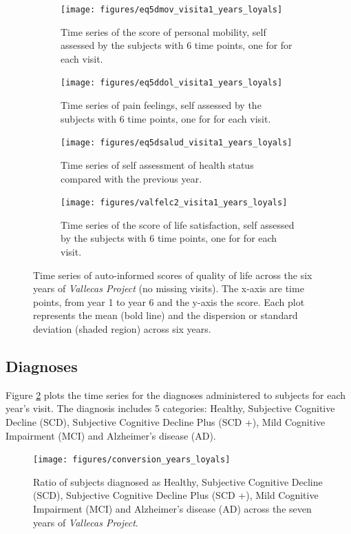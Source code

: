 \documentclass[11pt]{article}
\theoremstyle{definition}
\theoremstyle{remark}
\begin{document}
\begin{figure}[H]
    \centering
    \begin{subfigure}[t]{0.45\textwidth}
        \centering
        \texttt{[image: figures/eq5dmov\_visita1\_years\_loyals]}
        \caption{Time series of the score of personal mobility, self assessed by the subjects with 6 time points, one for for each visit.}
    \end{subfigure}
    \hfill 
    \begin{subfigure}[t]{0.45\textwidth}
        \centering
        \texttt{[image: figures/eq5ddol\_visita1\_years\_loyals]}
        \caption{Time series of pain feelings, self assessed by the subjects with 6 time points, one for for each visit.}
    \end{subfigure}%
    
     \begin{subfigure}[t]{0.45\textwidth}
        \centering
        \texttt{[image: figures/eq5dsalud\_visita1\_years\_loyals]}
        \caption{Time series of self assessment of health status compared with the previous year.}
    \end{subfigure}
    \hfill
    \begin{subfigure}[t]{0.45\textwidth}
        \centering
        \texttt{[image: figures/valfelc2\_visita1\_years\_loyals]}
        \caption{Time series of the score of life satisfaction, self assessed by the subjects with 6 time points, one for for each visit.}
    \end{subfigure}%
    \caption{Time series of auto-informed scores of quality of life across the six years of \emph{Vallecas Project} (no missing visits). The x-axis are time points, from year 1 to year 6 and the y-axis the score. Each plot represents the mean (bold line) and the dispersion or standard deviation (shaded region) across six years.}
    \label{fig:qol4}
\end{figure}

\subsection{Diagnoses}
\label{sse:diagn}

Figure \ref{fig:diag1} plots the time series for the diagnoses administered to subjects for each year's visit. The diagnosis includes 5 categories: Healthy, Subjective Cognitive Decline (SCD), Subjective Cognitive Decline Plus (SCD +), Mild Cognitive Impairment (MCI) and Alzheimer's disease (AD).
\begin{figure}[H]
        \centering
        \texttt{[image: figures/conversion\_years\_loyals]}
        \caption{Ratio of subjects diagnosed as Healthy, Subjective Cognitive Decline (SCD), Subjective Cognitive Decline Plus (SCD +), Mild Cognitive Impairment (MCI) and Alzheimer's disease (AD) across the seven years of \emph{Vallecas Project}.} 
        \label{fig:diag1}
\end{figure}
\end{document}
